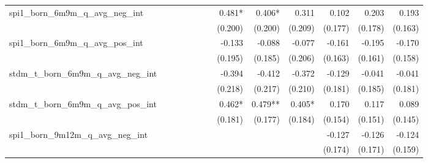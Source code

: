 \begin{tabular}{lrrrrrrrrrrrr}
spi1\_born\_6m9m\_q\_avg\_neg\_int          &              &              &              &              &              &              &       0.481* &       0.406* &        0.311 &        0.102 &        0.203 &        0.193 \\ 
                                            &              &              &              &              &              &              &      (0.200) &      (0.200) &      (0.209) &      (0.177) &      (0.178) &      (0.163) \\ 
spi1\_born\_6m9m\_q\_avg\_pos\_int          &              &              &              &              &              &              &       -0.133 &       -0.088 &       -0.077 &       -0.161 &       -0.195 &       -0.170 \\ 
                                            &              &              &              &              &              &              &      (0.195) &      (0.185) &      (0.206) &      (0.163) &      (0.161) &      (0.158) \\ 
stdm\_t\_born\_6m9m\_q\_avg\_neg\_int       &              &              &              &              &              &              &       -0.394 &       -0.412 &       -0.372 &       -0.129 &       -0.041 &       -0.041 \\ 
                                            &              &              &              &              &              &              &      (0.218) &      (0.217) &      (0.210) &      (0.181) &      (0.185) &      (0.181) \\ 
stdm\_t\_born\_6m9m\_q\_avg\_pos\_int       &              &              &              &              &              &              &       0.462* &      0.479** &       0.405* &        0.170 &        0.117 &        0.089 \\ 
                                            &              &              &              &              &              &              &      (0.181) &      (0.177) &      (0.184) &      (0.154) &      (0.151) &      (0.145) \\ 
spi1\_born\_9m12m\_q\_avg\_neg\_int         &              &              &              &              &              &              &              &              &              &       -0.127 &       -0.126 &       -0.124 \\ 
                                            &              &              &              &              &              &              &              &              &              &      (0.174) &      (0.171) &      (0.159) \\ 

\end{tabular}
